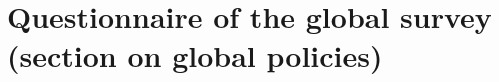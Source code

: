 
\clearpage 
\section{Questionnaire of the global survey (section on global policies)}\label{app:questionnaire_oecd}
\renewcommand{\theenumi}{\Alph{enumi}}
